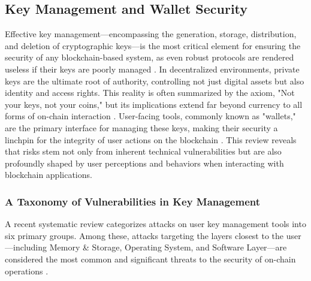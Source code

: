 \subsection{Key Management and Wallet Security}
Effective key management—encompassing the generation, storage, distribution, and deletion of cryptographic keys—is the most critical element for ensuring the security of any blockchain-based system, as even robust protocols are rendered useless if their keys are poorly managed \cite{fumy1993}. In decentralized environments, private keys are the ultimate root of authority, controlling not just digital assets but also identity and access rights. This reality is often summarized by the axiom, "Not your keys, not your coins," but its implications extend far beyond currency to all forms of on-chain interaction \cite{yu2024}. User-facing tools, commonly known as "wallets," are the primary interface for managing these keys, making their security a linchpin for the integrity of user actions on the blockchain \cite{suratkar2020}. This review reveals that risks stem not only from inherent technical vulnerabilities but are also profoundly shaped by user perceptions and behaviors when interacting with blockchain applications.

\subsubsection{A Taxonomy of Vulnerabilities in Key Management}
A recent systematic review categorizes attacks on user key management tools into six primary groups. Among these, attacks targeting the layers closest to the user—including Memory \& Storage, Operating System, and Software Layer—are considered the most common and significant threats to the security of on-chain operations \cite{houy2023}.

